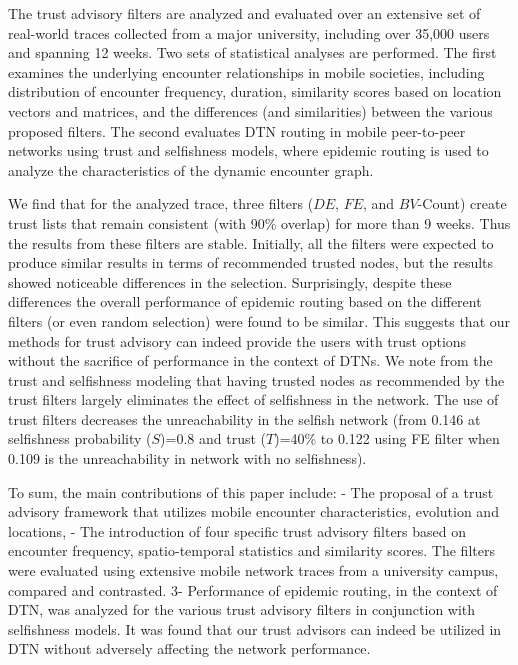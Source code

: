 \documentclass[10pt,conference]{IEEEtran}
\begin{document}
The trust advisory filters are analyzed and evaluated over an extensive set of real-world traces collected from a major university, including over 35,000 users and spanning 12 weeks. Two sets of statistical analyses are performed. The first examines the underlying encounter relationships in mobile societies, including distribution of encounter frequency, duration, similarity scores based on location vectors and matrices, and the differences (and similarities) between the various proposed filters. The second evaluates DTN routing in mobile peer-to-peer networks using trust and selfishness models, where epidemic routing is used to analyze the characteristics of the dynamic encounter graph.

We find that for the analyzed trace, three filters ($DE$, $FE$, and $BV$-Count) create trust lists that remain consistent (with 90\% overlap) for more than 9 weeks. Thus the results from these filters are stable.  Initially, all the filters were expected to produce similar results in terms of recommended trusted nodes, but the results showed noticeable differences in the selection. Surprisingly, despite these differences the overall performance of epidemic routing based on the different filters (or even random selection) were found to be similar. This suggests that our methods for trust advisory can indeed provide the users with trust options without the sacrifice of performance in the context of DTNs. We note from the trust and selfishness modeling that having trusted nodes as recommended by the trust filters largely eliminates the effect of selfishness in the network. The use of trust filters decreases the unreachability in the selfish network (from 0.146 at selfishness probability ($S$)=0.8 and trust ($T$)=40\% to 0.122 using FE filter when 0.109 is the unreachability in network with no selfishness).

To sum, the main contributions of this paper include: - The proposal of a trust advisory framework that utilizes mobile encounter characteristics, evolution and locations, - The introduction of four specific trust advisory filters based on encounter frequency, spatio-temporal statistics and similarity scores. The filters were evaluated using extensive mobile network traces from a university campus, compared and contrasted. 3- Performance of epidemic routing, in the context of DTN, was analyzed for the various trust advisory filters in conjunction with selfishness models. It was found that our trust advisors can indeed be utilized in DTN without adversely affecting the network performance.
\end{document}
